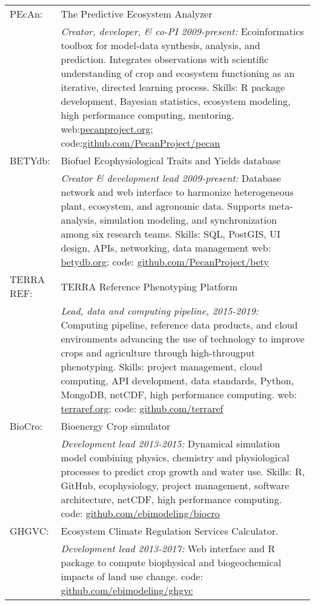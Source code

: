 \documentclass[a4paper,10pt]{article}
\begin{document}
\begin{tabular}{lp{}}

PEcAn:&The Predictive Ecosystem Analyzer\\
& \small \textit{Creator, developer, \& co-PI 2009-present:} Ecoinformatics toolbox for model-data synthesis, analysis, and prediction. Integrates observations with scientific understanding of crop and ecosystem functioning as an iterative, directed learning process. Skills: R package development, Bayesian statistics, ecosystem modeling, high performance computing, mentoring. web:\href{http://www.pecanproject.org}{pecanproject.org};  code:\href{https://github.com/PecanProject/pecan}{github.com/PecanProject/pecan}\vspace{0.5em}\\
BETYdb:&Biofuel Ecophysiological Traits and Yields database\\
& \small \textit{Creator \& development lead 2009-present:} Database network and web interface to harmonize heterogeneous plant, ecosystem, and agronomic data. Supports meta-analysis, simulation modeling, and synchronization among six research teams. Skills: SQL, PostGIS, UI design, APIs, networking, data management  web: \href{http://www.betydb.org}{betydb.org}; code:  \href{https://github.com/PecanProject/bety}{github.com/PecanProject/bety}\vspace{0.5em}\\
TERRA REF:&TERRA Reference Phenotyping Platform\\
& \small \textit{Lead, data and computing pipeline, 2015-2019:} Computing pipeline, reference data products, and cloud environments advancing the use of technology to improve crops and agriculture through high-througput phenotyping.
Skills: project management, cloud computing, API development, data standards, Python, MongoDB, netCDF, high performance computing. web: \href{http://www.terraref.org}{terraref.org}; code:  \href{https://github.com/terraref}{github.com/terraref}\vspace{0.5em}\\
BioCro:&Bioenergy Crop simulator\\
& \small \textit{Development lead 2013-2015:} Dynamical simulation model combining physics, chemistry and physiological processes to predict crop growth and water use. Skills: R, GitHub, ecophysiology, project management, software architecture, netCDF, high performance computing. code: \href{https://github.com/ebimodeling/biocro}{github.com/ebimodeling/biocro}\vspace{0.5em}\\

GHGVC:& Ecosystem Climate Regulation Services Calculator.\\
& \small \textit{Development lead 2013-2017:} Web interface and R package to compute biophysical and biogeochemical impacts of land use change. %
code: \href{https://github.com/ebimodeling/ghgvc}{github.com/ebimodeling/ghgvc}%
\\

\end{tabular}
\end{document}
